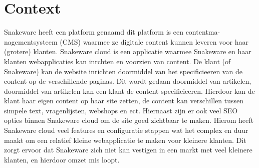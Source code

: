 \section{Context}
Snakeware heeft een platform genaamd  dit platform is een contentma-
nagementsysteem (CMS) waarmee ze digitale content kunnen leveren voor haar (grotere) klanten.
Snakeware cloud is een applicatie waarmee Snakeware en haar klanten webapplicaties kan inrchten en voorzien van content.
\whitespace
De klant (of Snakeware) kan de website inrichten doormiddel van het specificieeren van de content op de verschillende paginas.
Dit wordt gedaan doormiddel van artikelen, doormiddel van artikelen kan een klant de content specificieeren.
Hierdoor kan de klant haar eigen content op haar site zetten, de content kan verschillen tussen simpele text, vragenlijsten, webshops en ect.
Hiernaast zijn er ook veel SEO opties binnen Snakeware cloud om de site goed zichtbaar te maken.
Hierom heeft Snakeware cloud veel features en configuratie stappen wat het complex en duur maakt om een relatief kleine webapplicatie te maken voor kleinere klanten.
\whitespace
Dit zorgt ervoor dat Snakeware zich niet kan vestigen in een markt met veel kleinere klanten,
en hierdoor omzet mis loopt.
